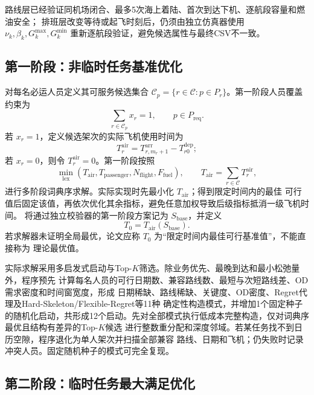 \documentclass[UTF8,a4paper,zihao=5]{ctexart}
\begin{document}
路线层已经验证同机场闭合、最多5次海上着陆、首次到达下机、逐航段容量和燃油安全；
排班层改变等待或起飞时刻后，仍须由独立仿真器使用
$\nu_k,\beta_k,G_k^{\max},G_k^{\min}$ 重新逐航段验证，避免候选属性与最终CSV不一致。

\subsection{第一阶段：非临时任务基准优化}

对每名必运人员定义其可服务候选集合
$\mathcal{C}_p=\{r\in\mathcal{C}:p\in P_r\}$。第一阶段人员覆盖约束为
\begin{equation}
  \sum_{r\in\mathcal{C}_p}x_r=1,
  \qquad p\in P_{\mathrm{req}}.
  \label{eq:q3-mandatory-cover}
\end{equation}
若 $x_r=1$，定义候选架次的实际飞机使用时间为
\begin{equation}
  T_r^{\mathrm{air}}
  =T_{r,m_r+1}^{\mathrm{arr}}-T_{r0}^{\mathrm{dep}};
  \label{eq:q3-flight-duration}
\end{equation}
若 $x_r=0$，则令 $T_r^{\mathrm{air}}=0$。第一阶段按照
\begin{equation}
  \min_{\mathrm{lex}}
  \left(
    T_{\mathrm{air}},
    T_{\mathrm{passenger}},
    N_{\mathrm{flight}},
    F_{\mathrm{fuel}}
  \right),
  \qquad
  T_{\mathrm{air}}=\sum_{r\in\mathcal{C}}T_r^{\mathrm{air}},
  \label{eq:q3-stage1-objective}
\end{equation}
进行多阶段词典序求解。实际实现时先最小化 $T_{\mathrm{air}}$；得到限定时间内的最佳
可行值后固定该值，再依次优化其余指标，避免任意加权导致后级指标抵消一级飞机时间。
将通过独立校验器的第一阶段方案记为 $S_{\mathrm{base}}$，并定义
\begin{equation}
  T_0=T_{\mathrm{air}}(S_{\mathrm{base}}).
  \label{eq:q3-baseline-time}
\end{equation}
若求解器未证明全局最优，论文应称 $T_0$ 为“限定时间内最佳可行基准值”，不能直接称为
理论最优值。

实际求解采用多启发式启动与Top-$K$筛选。除业务优先、最晚到达和最小松弛量外，程序预先
计算每名人员的可行日期数、兼容路线数、最短与次短路线差、OD需求密度和时间窗宽度，形成
日期稀缺、路线稀缺、关键度、OD密度、Regret代理及Hard-Skeleton/Flexible-Regret等11种
确定性构造模式，并增加1个固定种子的随机化启动，共形成12个启动。先对全部模式执行低成本完整构造，仅对词典序最优且结构有差异的Top-$K$候选
进行整数重分配和深度邻域。若某任务找不到日历空隙，程序退化为单人架次并扫描全部兼容
路线、日期和飞机；仍失败时记录冲突人员。固定随机种子的模式可完全复现。
\subsection{第二阶段：临时任务最大满足优化}
\end{document}
